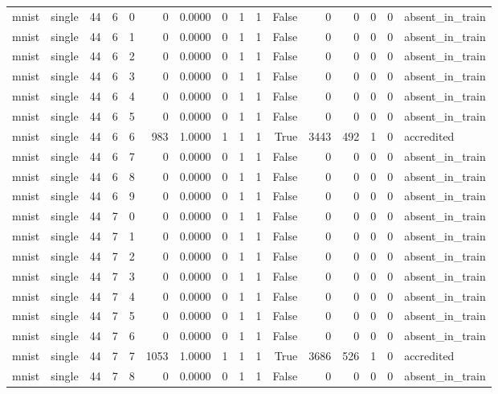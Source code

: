 \begin{tabular}{llrrrrrrrrrrrrrl}
mnist & single & 44 & 6 & 0 & 0 & 0.0000 & 0 & 1 & 1 & False & 0 & 0 & 0 & 0 & absent\_in\_train \\
mnist & single & 44 & 6 & 1 & 0 & 0.0000 & 0 & 1 & 1 & False & 0 & 0 & 0 & 0 & absent\_in\_train \\
mnist & single & 44 & 6 & 2 & 0 & 0.0000 & 0 & 1 & 1 & False & 0 & 0 & 0 & 0 & absent\_in\_train \\
mnist & single & 44 & 6 & 3 & 0 & 0.0000 & 0 & 1 & 1 & False & 0 & 0 & 0 & 0 & absent\_in\_train \\
mnist & single & 44 & 6 & 4 & 0 & 0.0000 & 0 & 1 & 1 & False & 0 & 0 & 0 & 0 & absent\_in\_train \\
mnist & single & 44 & 6 & 5 & 0 & 0.0000 & 0 & 1 & 1 & False & 0 & 0 & 0 & 0 & absent\_in\_train \\
mnist & single & 44 & 6 & 6 & 983 & 1.0000 & 1 & 1 & 1 & True & 3443 & 492 & 1 & 0 & accredited \\
mnist & single & 44 & 6 & 7 & 0 & 0.0000 & 0 & 1 & 1 & False & 0 & 0 & 0 & 0 & absent\_in\_train \\
mnist & single & 44 & 6 & 8 & 0 & 0.0000 & 0 & 1 & 1 & False & 0 & 0 & 0 & 0 & absent\_in\_train \\
mnist & single & 44 & 6 & 9 & 0 & 0.0000 & 0 & 1 & 1 & False & 0 & 0 & 0 & 0 & absent\_in\_train \\
mnist & single & 44 & 7 & 0 & 0 & 0.0000 & 0 & 1 & 1 & False & 0 & 0 & 0 & 0 & absent\_in\_train \\
mnist & single & 44 & 7 & 1 & 0 & 0.0000 & 0 & 1 & 1 & False & 0 & 0 & 0 & 0 & absent\_in\_train \\
mnist & single & 44 & 7 & 2 & 0 & 0.0000 & 0 & 1 & 1 & False & 0 & 0 & 0 & 0 & absent\_in\_train \\
mnist & single & 44 & 7 & 3 & 0 & 0.0000 & 0 & 1 & 1 & False & 0 & 0 & 0 & 0 & absent\_in\_train \\
mnist & single & 44 & 7 & 4 & 0 & 0.0000 & 0 & 1 & 1 & False & 0 & 0 & 0 & 0 & absent\_in\_train \\
mnist & single & 44 & 7 & 5 & 0 & 0.0000 & 0 & 1 & 1 & False & 0 & 0 & 0 & 0 & absent\_in\_train \\
mnist & single & 44 & 7 & 6 & 0 & 0.0000 & 0 & 1 & 1 & False & 0 & 0 & 0 & 0 & absent\_in\_train \\
mnist & single & 44 & 7 & 7 & 1053 & 1.0000 & 1 & 1 & 1 & True & 3686 & 526 & 1 & 0 & accredited \\
mnist & single & 44 & 7 & 8 & 0 & 0.0000 & 0 & 1 & 1 & False & 0 & 0 & 0 & 0 & absent\_in\_train \\

\end{tabular}
